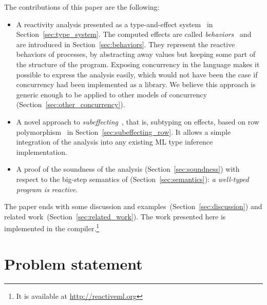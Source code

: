 \documentclass[9pt,preprint]{sigplanconf}
\begin{document}

The contributions of this paper are the following:
\begin{itemize}
\item A reactivity analysis presented as a type-and-effect system~\cite{Lucassen:1988} in Section~\ref{sec:type_system}. The computed effects are called \emph{behaviors}~\cite{Amtoft:1999} and are introduced in Section~\ref{sec:behaviors}. They represent the reactive behaviors of processes, by abstracting away values but keeping some part of the structure of the program. Exposing concurrency in the language makes it possible to express the analysis easily, which would not have been the case if concurrency had been implemented as a library. We believe this approach is generic enough to be applied to other models of concurrency (Section~\ref{sec:other_concurrency}).
\item A novel approach to \emph{subeffecting}~\cite{Nielson:1999}, that is, subtyping on effects, based on row polymorphism~\cite{Remy:1993} in Section~\ref{sec:subeffecting_row}. It allows a simple integration of the analysis into any existing ML type inference implementation.
\item A proof of the soundness of the analysis (Section~\ref{sec:soundness}) with respect to the big-step semantics of \rml (Section~\ref{sec:semantics}): \emph{a well-typed program is reactive}.
\end{itemize}

The paper ends with some discussion and examples~(Section~\ref{sec:discussion}) and related work~(Section~\ref{sec:related_work}). The work presented here is implemented in the \rml compiler.\footnote{It is available at \url{http://reactiveml.org}}

\clearpage

\section{Problem statement}
\label{sec:problem}
\end{document}
